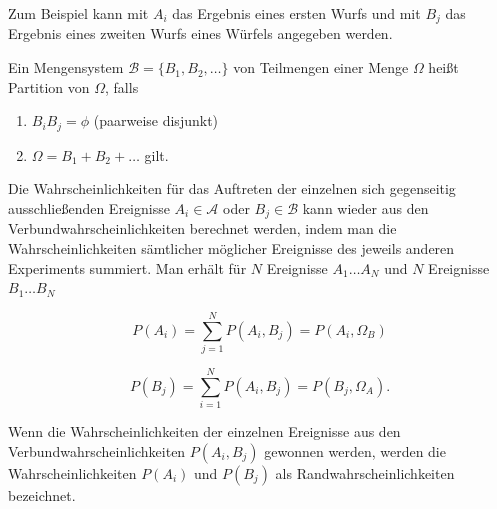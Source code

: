 Zum Beispiel kann mit $A_i$ das Ergebnis eines ersten Wurfs und mit $B_j$ das Ergebnis eines zweiten Wurfs eines Würfels angegeben werden.

\begin{definition}[Partition]
Ein Mengensystem $\mathcal{B} = \{B_1, B_2, \ldots\}$ von Teilmengen einer Menge $\Omega$ heißt Partition von $\Omega$, falls

\begin{enumerate}
  \item $B_i B_j = \phi$ \quad (paarweise disjunkt)
  \item $\Omega = B_1 + B_2 + \ldots$ \quad gilt.
\end{enumerate}
\end{definition}

Die Wahrscheinlichkeiten für das Auftreten der einzelnen sich gegenseitig ausschließenden Ereignisse $A_i \in \mathcal{A}$ oder $B_j \in \mathcal{B}$ kann wieder aus den Verbundwahrscheinlichkeiten berechnet werden, indem man die Wahrscheinlichkeiten sämtlicher möglicher Ereignisse des jeweils anderen Experiments summiert. Man erhält für $N$ Ereignisse $A_1 \ldots A_N$ und $N$ Ereignisse $B_1 \ldots B_N$

$$
P(A_i) = \sum_{j=1}^{N} P(A_i, B_j) = P(A_i, \Omega_B)
$$

$$
P(B_j) = \sum_{i=1}^{N} P(A_i, B_j) = P(B_j, \Omega_A).
$$

Wenn die Wahrscheinlichkeiten der einzelnen Ereignisse aus den Verbundwahrscheinlichkeiten $P(A_i, B_j)$ gewonnen werden, werden die Wahrscheinlichkeiten $P(A_i)$ und $P(B_j)$ als Randwahrscheinlichkeiten bezeichnet.

